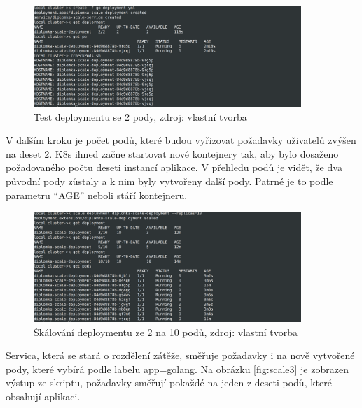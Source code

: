 \begin{figure}[H]
  \begin{centering}
    
	  \includegraphics[width=0.9\textwidth]{images/scale1.png}
    \par
	  \caption{Test deploymentu se 2 pody\label{fig:scale1}, zdroj: vlastní tvorba}
    \end{centering}
\end{figure}

V dalším kroku je počet podů, které budou vyřizovat požadavky uživatelů zvýšen \linebreak na deset \ref{fig:scale2}. K8s ihned začne startovat nové kontejnery tak, aby bylo dosaženo \linebreak požadovaného počtu deseti instancí aplikace. V přehledu podů je vidět, že dva původní pody zůstaly a k nim byly vytvořeny další pody. Patrné je to podle parametru “AGE” neboli stáří kontejneru.

\begin{figure}[H]
  \begin{centering}
    
	  \includegraphics[width=0.9\textwidth]{images/scale2.png}
    \par
	  \caption{Škálování deploymentu ze 2 na 10 podů\label{fig:scale2}, zdroj: vlastní tvorba}
    \end{centering}
\end{figure}

Servica, která se stará o rozdělení zátěže, směřuje požadavky i na nově vytvořené pody, které vybírá podle labelu app=golang. Na obrázku \ref{fig:scale3} je zobrazen výstup \linebreak ze skriptu, požadavky směřují pokaždé na jeden z deseti podů, které obsahují aplikaci.

